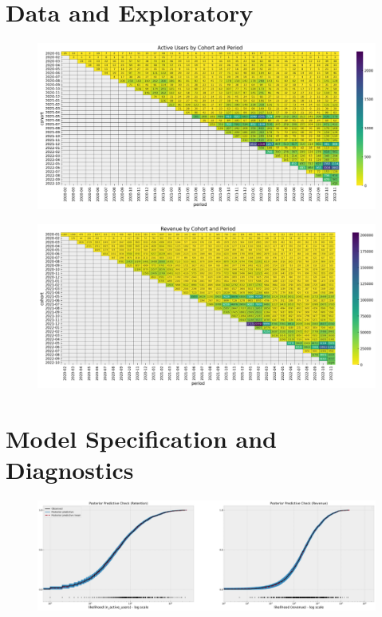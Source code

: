 \documentclass[11pt]{amsart}
\begin{document}
\section{Data and Exploratory}

\begin{figure}
\includegraphics[width=\textwidth]{images/revenue_retention_21_0.png}
\end{figure}

\begin{figure}
    \includegraphics[width=\textwidth]{images/revenue_retention_23_0.png}
\end{figure}

\section{Model Specification and Diagnostics}

\begin{figure}
    \includegraphics[width=\textwidth]{images/revenue_retention_37_0.png}
\end{figure}
\end{document}
